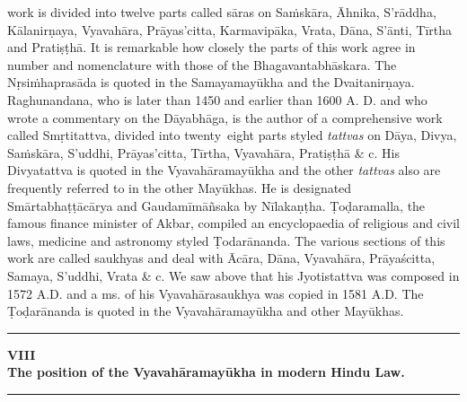\documentclass[11pt, openany]{book}
\begin{document}
\noindent
work is divided into twelve parts called sāras on Saṁskāra, Āhnika, S'rāddha, Kālanirṇaya, Vyavahāra, Prāyas'citta, Karmavipāka, Vrata, Dāna, S'ānti, Tīrtha and Pratiṣṭhā. It is remarkable how closely the parts of this work agree in number and nomenclature with those of the Bhagavantabhāskara. The Nṛsiṁhaprasāda is quoted in the Samayamayūkha and the Dvaitanirṇaya. Raghunandana, who is later than 1450 and earlier than 1600 A. D. and who wrote a commentary on the Dāyabhāga, is the author of a comprehensive work called Smṛtitattva, divided into twenty\textendash\ eight parts styled \emph{\en tattvas} on Dāya, Divya, Saṁskāra, S'uddhi, Prāyas'citta, Tīrtha, Vyavahāra, Pratiṣṭhā \& c. His Divyatattva is quoted in the Vyavahāramayūkha and the other \emph{\en tattvas} also are frequently referred to in the other Mayūkhas. He is designated Smārtabhaṭṭācārya and Gaudamīmāñsaka by Nīlakaṇṭha. Ṭoḍaramalla, the famous finance minister of Akbar, compiled an encyclopaedia of religious and civil laws, medicine and astronomy styled Ṭodarānanda. The various sections of this work are called saukhyas and deal with Ācāra, Dāna, Vyavahāra, Prāyaścitta, Samaya, S'uddhi, Vrata \& c. We saw above that his Jyotistattva was composed in 1572 A.D. and a ms. of his Vyavahārasaukhya was copied in 1581 A.D. The Ṭoḍarānanda is quoted in the Vyavahāramayūkha and other Mayūkhas. 

\begin{center}
\rule{0.2\linewidth}{0.5pt}
\end{center}

\fancyhead[RE,LO]{\thepage}
\cfoot{}
\newpage
\renewcommand{\thepage}{\Roman{page}}
\setcounter{page}{41}


\begin{center}
\textbf{\large VIII}\\

\vspace{1mm}
\textbf{\large The position of the Vyavahāramayūkha in modern Hindu Law.}\\

\rule{0.2\linewidth}{0.5pt}
\end{center}
\end{document}
